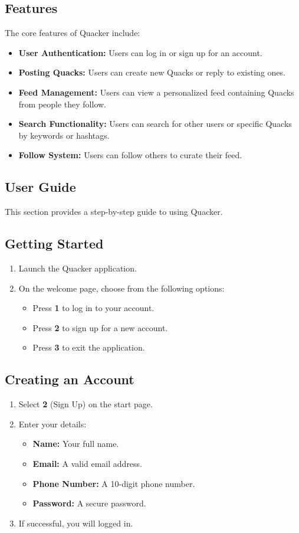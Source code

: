 \documentclass[11pt]{article}
\begin{document}
\subsection{Features} The core features of Quacker include: \begin{itemize}
\item \textbf{User Authentication:} Users can log in or sign up for an account.
\item \textbf{Posting Quacks:} Users can create new Quacks or reply to existing
ones. \item \textbf{Feed Management:} Users can view a personalized feed
containing Quacks from people they follow. \item \textbf{Search Functionality:}
Users can search for other users or specific Quacks by keywords or hashtags.
\item \textbf{Follow System:} Users can follow others to curate their feed.
\end{itemize}

\subsection{User Guide} This section provides a step-by-step guide to using
Quacker.

\subsection*{Getting Started} \begin{enumerate} \item Launch the Quacker
application. \item On the welcome page, choose from the following options:
\begin{itemize} \item Press \textbf{1} to log in to your account. \item Press
\textbf{2} to sign up for a new account. \item Press \textbf{3} to exit the
application. \end{itemize} \end{enumerate}

\subsection*{Creating an Account} \begin{enumerate} \item Select \textbf{2}
(Sign Up) on the start page. \item Enter your details: \begin{itemize} \item
\textbf{Name:} Your full name. \item \textbf{Email:} A valid email address.
\item \textbf{Phone Number:} A 10-digit phone number. \item \textbf{Password:} A
secure password. \end{itemize} \item If successful, you will logged in.
\end{enumerate}
\end{document}
